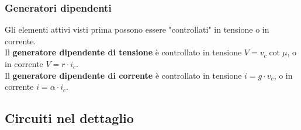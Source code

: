 \documentclass{article}
\begin{document}
\subsubsection{Generatori dipendenti}
Gli elementi attivi visti prima possono essere "controllati" in tensione o in corrente.
\vspace*{0.2cm}\\
Il \textbf{generatore dipendente di tensione} è controllato in tensione $V=v_c \cot \mu$, o in corrente $V = r \cdot i_c$.
\vspace*{0.2cm}\\
Il \textbf{generatore dipendente di corrente} è controllato in tensione $i = g \cdot v_c$, o in corrente $i = \alpha \cdot i_c$.



\subsection{Circuiti nel dettaglio}
\end{document}
